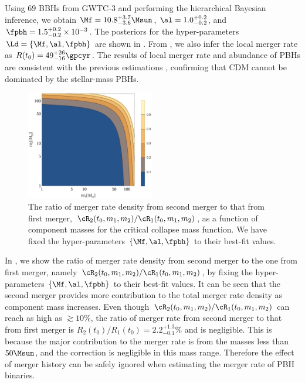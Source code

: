 \documentclass[
reprint,           %
superscriptaddress,%
amsmath,           %
amssymb,           %
aps,               %
prd,               %
notitlepage,       %
longbibliography,  %
floatfix,          %
nofootinbib,
]{revtex4-1}
\begin{document}
Using $69$ BBHs from GWTC-3 and performing the hierarchical Bayesian inference, we obtain $\Mf = 10.8^{+3.7}_{-3.6} \Msun$, $\al = 1.0^{+0.2}_{-0.2}$, and $\fpbh = 1.5^{+0.2}_{-0.2} \times 10^{-3}$. The posteriors for the hyper-parameters $\Ld = \{\Mf, \al, \fpbh\}$ are shown in . From , we also infer the local merger rate as $R(t_0) = 49^{+26}_{-16} \gpcyr$. The results of local merger rate and abundance of PBHs are consistent with the previous estimations \cite{Chen:2018czv,Chen:2018rzo,Chen:2019irf,Wu:2020drm,Chen:2021nxo,Chen:2022fda}, confirming that CDM cannot be dominated by the stellar-mass PBHs. 


\begin{figure}[tbp!]
	\centering
	\includegraphics[width=0.5\textwidth]{ratio-CC.pdf}
	\caption{\label{ratio-CC}The ratio of merger rate density from second merger to that from first merger, $\cR_2(t_0, m_1, m_2)/\cR_1(t_0, m_1, m_2)$, as a function of component masses for the critical collapse mass function. We have fixed the hyper-parameters $\{\Mf, \al, \fpbh\}$ to their best-fit values.}
\end{figure}

In , we show the ratio of merger rate density from second merger to the one from first merger, namely $\cR_2(t_0, m_1, m_2)/\cR_1(t_0, m_1, m_2)$, by fixing the hyper-parameters $\{\Mf, \al, \fpbh\}$ to their best-fit values. It can be seen that the second merger provides more contribution to the total merger rate density as component mass increases. Even though $\cR_2(t_0, m_1, m_2)/\cR_1(t_0, m_1, m_2)$ can reach as high as $\gtrsim 10\%$, the ratio of merger rate from second merger to that from first merger is $R_2(t_0)/R_1(t_0) = 2.2^{+1.3}_{-0.1}\%$ and is negligible. This is because the major contribution to the merger rate is from the masses less than $50\Msun$, and the correction is negligible in this mass range. Therefore the effect of merger history can be safely ignored when estimating the merger rate of PBH binaries.
\end{document}
